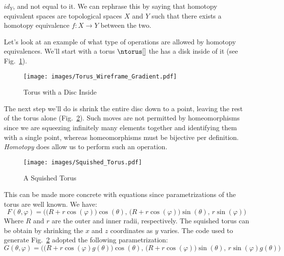 \documentclass{article}                                                        %
\begin{document}
        $id_{Y}$, and not equal to it. We can rephrase this by saying that
        homotopy equivalent spaces are topological spaces $X$ and $Y$ such
        that there exists a homotopy equivalence $f:X\rightarrow{Y}$
        between the two.
        \par\hfill\par
        Let's look at an example of what type of operations are allowed by
        homotopy equivalences. We'll start with a torus $\ntorus[]$ the has a
        disk inside of it (see Fig.~\ref{fig:Torus_with_Disc_Inside}).
        \begin{figure}[H]
            \centering
            \captionsetup{type=figure}
            \texttt{[image: images/Torus\_Wireframe\_Gradient.pdf]}
            \caption{Torus with a Disc Inside}
            \label{fig:Torus_with_Disc_Inside}
        \end{figure}
        The next step we'll do is shrink the entire disc down to a point,
        leaving the rest of the torus alone (Fig.~\ref{fig:Squished_Torus}).
        Such moves are not permitted by homeomorphisms since we are squeezing
        infinitely many elements together and identifying them with a single
        point, whereas homeomorphisms must be bijective per definition.
        \textit{Homotopy} does allow us to perform such an operation.
        \begin{figure}[H]
            \centering
            \captionsetup{type=figure}
            \texttt{[image: images/Squished\_Torus.pdf]}
            \caption{A Squished Torus}
            \label{fig:Squished_Torus}
        \end{figure}
        This can be made more concrete with
        equations since parametrizations of the torus are well known. We have:
        \begin{equation}
            F(\theta,\varphi)=\Big(
                \big(R+r\cos(\varphi)\big)\cos(\theta),\,
                \big(R+r\cos(\varphi)\big)\sin(\theta),\,
                r\sin(\varphi)\Big)
        \end{equation}
        Where $R$ and $r$ are the outer and inner radii, respectively. The
        squished torus can be obtain by shrinking the $x$ and $z$ coordinates
        as $y$ varies. The code used to generate Fig.~\ref{fig:Squished_Torus}
        adopted the following parametrization:
        \begin{equation}
                G(\theta,\varphi)=\Big(
                    \big(R+r\cos(\varphi)g(\theta)\big)\cos(\theta),\,
                    \big(R+r\cos(\varphi)\big)\sin(\theta),\,
                    r\sin(\varphi)g(\theta)\Big)
        \end{equation}
\end{document}
